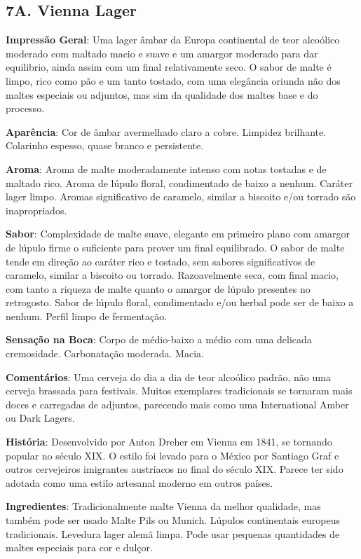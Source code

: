\subsection*{7A. Vienna Lager}

\textbf{Impressão Geral}: Uma lager âmbar da Europa continental de teor alcoólico moderado com maltado macio e suave e um amargor moderado para dar equilibrio, ainda assim com um final relativamente seco. O sabor de malte é limpo, rico como pão e um tanto tostado, com uma elegância oriunda não dos maltes especiais ou adjuntos, mas sim da qualidade dos maltes base e do processo.

\textbf{Aparência}: Cor de âmbar avermelhado claro a cobre. Limpidez brilhante. Colarinho espesso, quase branco e persistente.

\textbf{Aroma}: Aroma de malte moderadamente intenso com notas tostadas e de maltado rico. Aroma de lúpulo floral, condimentado de baixo a nenhum. Caráter lager limpo. Aromas significativo de caramelo, similar a biscoito e/ou torrado são inapropriados.

\textbf{Sabor}: Complexidade de malte suave, elegante em primeiro plano com amargor de lúpulo firme o suficiente para prover um final equilibrado. O sabor de malte tende em direção ao caráter rico e tostado, sem sabores significativos de caramelo, similar a biscoito ou torrado. Razoavelmente seca, com final macio, com tanto a riqueza de malte quanto o amargor de lúpulo presentes no retrogosto. Sabor de lúpulo floral, condimentado e/ou herbal pode ser de baixo a nenhum. Perfil limpo de fermentação.

\textbf{Sensação na Boca}: Corpo de médio-baixo a médio com uma delicada cremosidade. Carbonatação moderada. Macia.

\textbf{Comentários}: Uma cerveja do dia a dia de teor alcoólico padrão, não uma cerveja brassada para festivais. Muitos exemplares tradicionais se tornaram mais doces e carregadas de adjuntos, parecendo mais como uma International Amber ou Dark Lagers.

\textbf{História}: Desenvolvido por Anton Dreher em Vienna em 1841, se tornando popular no século XIX. O estilo foi levado para o México por Santiago Graf e outros cervejeiros imigrantes austríacos no final do século XIX. Parece ter sido adotada como uma estilo artesanal moderno em outros países.

\textbf{Ingredientes}: Tradicionalmente malte Vienna da melhor qualidade, mas também pode ser usado Malte Pils ou Munich. Lúpulos continentais europeus tradicionais. Levedura lager alemã limpa. Pode usar pequenas quantidades de maltes especiais para cor e dulçor.

